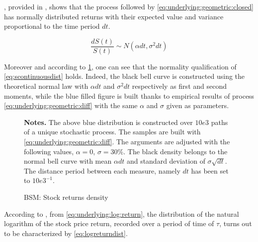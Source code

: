 \documentclass[12pt,a4paper]{report}
\newcommand{\St}{S\left(t\right)}
\newcommand{\dSt}{dS\left(t\right)}
\newcommand{\dSr}{\frac{\dSt}{\St}}
\begin{document}
, provided in \citet{shreve},  shows that the process followed by \cref{eq:underlying:geometric:closed} has normally distributed returns with their expected value and variance proportional to the time period $dt$.

\begin{center}
\begin{equation}
\dSr \sim N(\alpha dt, \sigma^2 dt)
\label{eq:scontinuousdist}
\end{equation}
\end{center}  
Moreover and according to \cref{p:returndensity}, one can see that the normality qualification of \cref{eq:scontinuousdist} holds. 
Indeed, the black bell curve is constructed using the theoretical normal law with $\alpha dt$ and $\sigma^2 dt$ respectively as first and second moments, while the blue filled figure is built thanks to empirical results of process \ref{eq:underlying:geometric:diff} with the same $\alpha$ and $\sigma$ given as parameters.

 
\begin{figure}[!h]
\centering

\caption{BSM: Stock returns density}
\label{p:returndensity}
  \begin{changemargin}{0.5cm}{0.5cm}
  \medskip
\footnotesize
{}\textbf{Notes.}   
The above blue distribution is constructed over $10e3$ paths of a unique stochastic process. 
The samples are built with \cref{eq:underlying:geometric:diff}. 
The arguments are adjusted with the following values, $\alpha = 0$, $\sigma = 30\%$. 
The black density belongs to the normal bell curve with mean $\alpha dt$ and standard deviation of $\sigma  \sqrt{dt}$. 
The distance period between each measure, namely $dt$ has been set to $10e3^{-1}$.
\end{changemargin} 
\end{figure}













According to \citet{shreve}, from \cref{eq:underlying:log:return}, the distribution of the natural logarithm of the stock price return, recorded over a period of time of $\tau$, turns out to be characterized by \cref{eq:logreturndist}.
\end{document}
